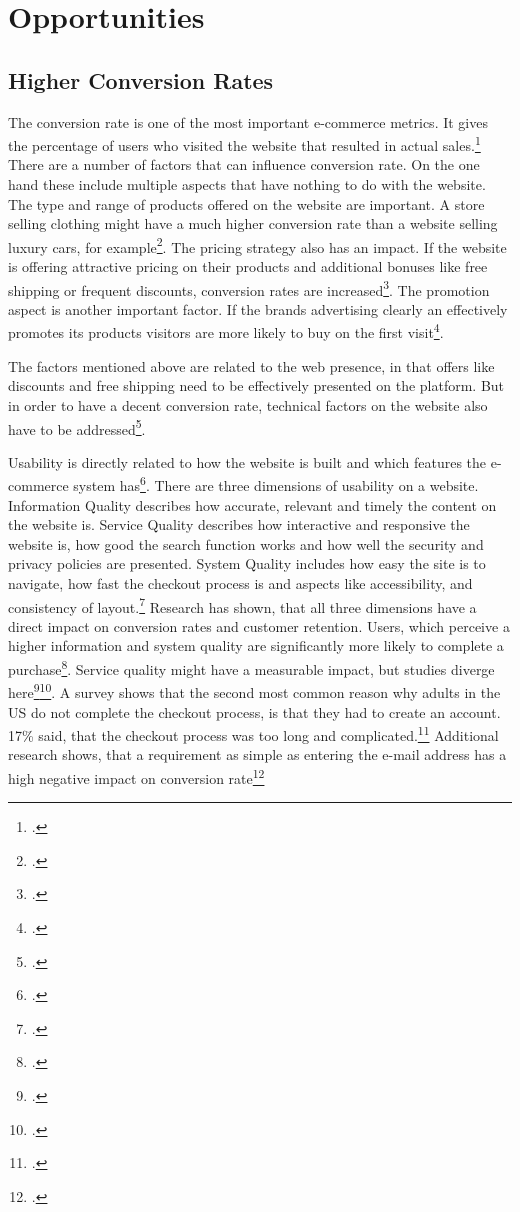 \newpage
\section{Opportunities}

\subsection{Higher Conversion Rates}

The conversion rate is one of the most important e-commerce metrics.
It gives the percentage of users who visited the website that resulted in actual sales.\footcite[Cp.][p. 1]{Gabir2018}
There are a number of factors that can influence conversion rate.
On the one hand these include multiple aspects that have nothing to do with the website.
The type and range of products offered on the website are important.
A store selling clothing might have a much higher conversion rate than a website selling luxury cars, for example\footcite[Cp.][p.165]{Fatta2018}.
The pricing strategy also has an impact. If the website is offering attractive pricing on their products and additional
bonuses like free shipping or frequent discounts, conversion rates are increased\footcite[Cp.][p.165]{Fatta2018}.
The promotion aspect is another important factor. If the brands advertising clearly an effectively promotes its products
visitors are more likely to buy on the first visit\footcite[Cp.][p.165]{Fatta2018}.

The factors mentioned above are related to the web presence, in that offers like discounts and free shipping
need to be effectively presented on the platform. But in order to have a decent conversion rate, technical
factors on the website also have to be addressed\footcite[Cp.][p. 5]{Gabir2018}.

Usability is directly related to how the website is built and which features the e-commerce system has\footcite[Cp.][p. 2f]{Gabir2018}.
There are three dimensions of usability on a website.
Information Quality describes how accurate, relevant and timely the content on the website is.
Service Quality describes how interactive and responsive the website is, how good the search function works
and how well the security and privacy policies are presented.
System Quality includes how easy the site is to navigate, how fast the checkout process is
and aspects like accessibility, and consistency of layout.\footcite[Cp. ][p. 3]{Kuan}
Research has shown, that all three dimensions have a direct impact on conversion rates and customer retention.
Users, which perceive a higher information and system quality are significantly more likely to complete
a purchase\footcite[Cp.][p. 6]{Kuan}.
Service quality might have a measurable impact, but studies diverge here\footcite[Cp.][p. 6]{Kuan}\footcite[Cp.][p. 5]{Gabir2018}.
A survey shows that the second most common reason why adults in the \ac{US} do not complete the checkout
process, is that they had to create an account. 17\% said, that the checkout process was too long and complicated.\footcite[Cp.][]{Baymard2022}
Additional research shows, that a requirement as simple as entering the e-mail address has a high negative impact on conversion rate\footcite[Cp.][p. 4]{McDowell2016}

